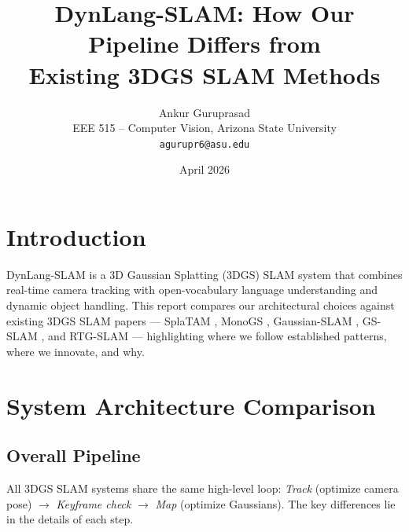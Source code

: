 \documentclass[10pt,twocolumn]{article}
\title{DynLang-SLAM: How Our Pipeline Differs from\\Existing 3DGS SLAM Methods}
\author{Ankur Guruprasad\\
EEE 515 -- Computer Vision, Arizona State University\\
\texttt{agurupr6@asu.edu}}
\date{April 2026}
\begin{document}
\maketitle

\section{Introduction}

DynLang-SLAM is a 3D Gaussian Splatting (3DGS) SLAM system that combines real-time camera tracking with open-vocabulary language understanding and dynamic object handling. This report compares our architectural choices against existing 3DGS SLAM papers --- SplaTAM \cite{splatam}, MonoGS \cite{monogs}, Gaussian-SLAM \cite{gaussianslam}, GS-SLAM \cite{gsslam}, and RTG-SLAM \cite{rtgslam} --- highlighting where we follow established patterns, where we innovate, and why.

\section{System Architecture Comparison}

\subsection{Overall Pipeline}

All 3DGS SLAM systems share the same high-level loop: \textit{Track} (optimize camera pose) $\rightarrow$ \textit{Keyframe check} $\rightarrow$ \textit{Map} (optimize Gaussians). The key differences lie in the details of each step.
\end{document}

